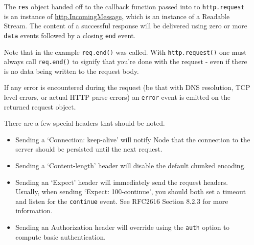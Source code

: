 \begin{Shaded}
\begin{Highlighting}[]
\NormalTok{(}\NormalTok{, }
  \NormalTok{(} \NormalTok{+ }\NormalTok{);}
\NormalTok{\});}

\NormalTok{();}
\end{Highlighting}
\end{Shaded}

The \texttt{res} object handed off to the callback function passed into
to \texttt{http.request} is an instance of
\hyperref[httpux5fhttpux5fincomingmessage]{http.IncomingMessage}, which
is an instance of a Readable Stream. The content of a successful
response will be delivered using zero or more \texttt{data} events
followed by a closing \texttt{end} event.

Note that in the example \texttt{req.end()} was called. With
\texttt{http.request()} one must always call \texttt{req.end()} to
signify that you're done with the request - even if there is no data
being written to the request body.

If any error is encountered during the request (be that with DNS
resolution, TCP level errors, or actual HTTP parse errors) an
\texttt{\textquotesingle{}error\textquotesingle{}} event is emitted on
the returned request object.

There are a few special headers that should be noted.

\begin{itemize}
\item
  Sending a `Connection: keep-alive' will notify Node that the
  connection to the server should be persisted until the next request.
\item
  Sending a `Content-length' header will disable the default chunked
  encoding.
\item
  Sending an `Expect' header will immediately send the request headers.
  Usually, when sending `Expect: 100-continue', you should both set a
  timeout and listen for the \texttt{continue} event. See RFC2616
  Section 8.2.3 for more information.
\item
  Sending an Authorization header will override using the \texttt{auth}
  option to compute basic authentication.
\end{itemize}

